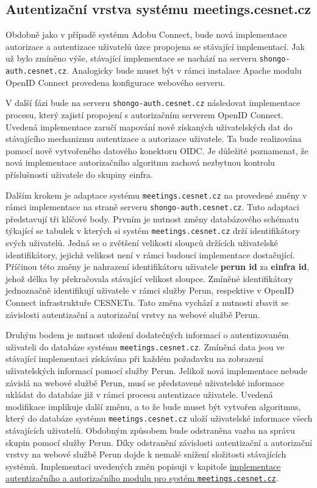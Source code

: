 \documentclass[
  printed, %
  twoside, %
  table,   %
  nolof,     %
  nolot,     %
]{fithesis3}
\begin{document}
\subsection{Autentizační vrstva systému meetings.cesnet.cz}
Obdobně jako v případě systému Adobu Connect, bude nová implementace autorizace a autentizace uživatelů úzce propojena se stávající implementací. Jak už bylo zmíněno výše, stávající implementace se nachází na serveru \texttt{shongo-auth.cesnet.cz}. Analogicky bude muset být v rámci instalace Apache modulu OpenID Connect provedena konfigurace webového serveru. \par
V další fázi bude na serveru \texttt{shongo-auth.cesnet.cz} následovat implementace procesu, který zajistí propojení s autorizačním serverem OpenID Connect. Uvedená implementace zaručí mapování nově získaných uživatelských dat do stávajícího mechanizmu autentizace a autorizace uživatele. Ta bude realizována pomocí nově vytvořeného datového konektoru OIDC. Je důležité poznamenat, že nová implementace autorizačního algoritmu zachová nezbytnou kontrolu příslušnosti uživatele do skupiny einfra. 
\par

Dalším krokem je adaptace systému \texttt{meetings.cesnet.cz} na provedené změny v rámci implementace na straně serveru \texttt{shongo-auth.cesnet.cz}. Tuto adaptaci představují tři klíčové body. Prvním je nutnost změny databázového schématu týkající se tabulek v kterých si systém \texttt{meetings.cesnet.cz} drží identifikátory svých uživatelů. Jedná se o zvětšení velikosti sloupců držících uživatelské identifikátory, jejichž velikost není v rámci budoucí implementace dostačující. Příčinou této změny je nahrazení identifikátoru uživatele \textbf{perun id} za \textbf{einfra id}, jehož délka by překračovala stávající velikost sloupce. Zmíněné identifikátory jednoznačně identifikují uživatele v rámci služby Perun, respektive v OpenID Connect infrastruktuře CESNETu. Tato změna vychází z nutnosti zbavit se závislosti autentizační a autorizační vrstvy na webové službě Perun. \par

Druhým bodem je nutnost uložení dodatečných informací o autentizovaném uživateli do databáze systému \texttt{meetings.cesnet.cz}. Zmíněná data jsou ve stávající implementaci získávána při každém požadavku na zobrazení uživatelských informací pomocí služby Perun. Jelikož nová implementace nebude závislá na webové službě Perun, musí se představené uživatelské informace ukládat do databáze již v rámci procesu autentizace uživatele. Uvedená modifikace implikuje další změnu, a to že bude muset být vytvořen algoritmus, který do databáze systému \texttt{meetings.cesnet.cz} uloží uživatelské informace všech stávajících uživatelů. Obdobným způsobem bude odstraněna vazba na správu skupin pomocí služby Perun. Díky odstranění závislosti autentizační a autorizační vrstvy na webové službě Perun dojde k nemalé snížení složitosti stávajících systémů. Implementaci uvedených změn popisuji v kapitole \hyperref[ShongoImpl]{implementace autentizačního a autorizačního modulu pro systém \texttt{meetings.cesnet.cz}}. \par 
\end{document}
